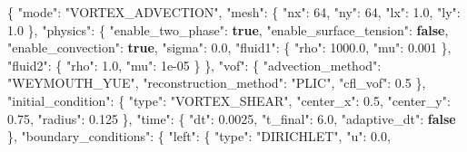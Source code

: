 \documentclass[
  10pt,
]{article}
\newenvironment{Shaded}{}{}
\newcommand{\DataTypeTok}[1]{\textcolor[rgb]{0.56,0.13,0.00}{#1}}
\newcommand{\DecValTok}[1]{\textcolor[rgb]{0.25,0.63,0.44}{#1}}
\newcommand{\FloatTok}[1]{\textcolor[rgb]{0.25,0.63,0.44}{#1}}
\newcommand{\FunctionTok}[1]{\textcolor[rgb]{0.02,0.16,0.49}{#1}}
\newcommand{\KeywordTok}[1]{\textcolor[rgb]{0.00,0.44,0.13}{\textbf{#1}}}
\newcommand{\StringTok}[1]{\textcolor[rgb]{0.25,0.44,0.63}{#1}}
\begin{document}
\begin{Shaded}
\begin{Highlighting}[]
\FunctionTok{\{}
  \DataTypeTok{"mode"}\FunctionTok{:} \StringTok{"VORTEX\_ADVECTION"}\FunctionTok{,}
  \DataTypeTok{"mesh"}\FunctionTok{:} \FunctionTok{\{}
    \DataTypeTok{"nx"}\FunctionTok{:} \DecValTok{64}\FunctionTok{,}
    \DataTypeTok{"ny"}\FunctionTok{:} \DecValTok{64}\FunctionTok{,}
    \DataTypeTok{"lx"}\FunctionTok{:} \FloatTok{1.0}\FunctionTok{,}
    \DataTypeTok{"ly"}\FunctionTok{:} \FloatTok{1.0}
  \FunctionTok{\},}
  \DataTypeTok{"physics"}\FunctionTok{:} \FunctionTok{\{}
    \DataTypeTok{"enable\_two\_phase"}\FunctionTok{:} \KeywordTok{true}\FunctionTok{,}
    \DataTypeTok{"enable\_surface\_tension"}\FunctionTok{:} \KeywordTok{false}\FunctionTok{,}
    \DataTypeTok{"enable\_convection"}\FunctionTok{:} \KeywordTok{true}\FunctionTok{,}
    \DataTypeTok{"sigma"}\FunctionTok{:} \FloatTok{0.0}\FunctionTok{,}
    \DataTypeTok{"fluid1"}\FunctionTok{:} \FunctionTok{\{}
      \DataTypeTok{"rho"}\FunctionTok{:} \FloatTok{1000.0}\FunctionTok{,}
      \DataTypeTok{"mu"}\FunctionTok{:} \FloatTok{0.001}
    \FunctionTok{\},}
    \DataTypeTok{"fluid2"}\FunctionTok{:} \FunctionTok{\{}
      \DataTypeTok{"rho"}\FunctionTok{:} \FloatTok{1.0}\FunctionTok{,}
      \DataTypeTok{"mu"}\FunctionTok{:} \DecValTok{1e{-}05}
    \FunctionTok{\}}
  \FunctionTok{\},}
  \DataTypeTok{"vof"}\FunctionTok{:} \FunctionTok{\{}
    \DataTypeTok{"advection\_method"}\FunctionTok{:} \StringTok{"WEYMOUTH\_YUE"}\FunctionTok{,}
    \DataTypeTok{"reconstruction\_method"}\FunctionTok{:} \StringTok{"PLIC"}\FunctionTok{,}
    \DataTypeTok{"cfl\_vof"}\FunctionTok{:} \FloatTok{0.5}
  \FunctionTok{\},}
  \DataTypeTok{"initial\_condition"}\FunctionTok{:} \FunctionTok{\{}
    \DataTypeTok{"type"}\FunctionTok{:} \StringTok{"VORTEX\_SHEAR"}\FunctionTok{,}
    \DataTypeTok{"center\_x"}\FunctionTok{:} \FloatTok{0.5}\FunctionTok{,}
    \DataTypeTok{"center\_y"}\FunctionTok{:} \FloatTok{0.75}\FunctionTok{,}
    \DataTypeTok{"radius"}\FunctionTok{:} \FloatTok{0.125}
  \FunctionTok{\},}
  \DataTypeTok{"time"}\FunctionTok{:} \FunctionTok{\{}
    \DataTypeTok{"dt"}\FunctionTok{:} \FloatTok{0.0025}\FunctionTok{,}
    \DataTypeTok{"t\_final"}\FunctionTok{:} \FloatTok{6.0}\FunctionTok{,}
    \DataTypeTok{"adaptive\_dt"}\FunctionTok{:} \KeywordTok{false}
  \FunctionTok{\},}
  \DataTypeTok{"boundary\_conditions"}\FunctionTok{:} \FunctionTok{\{}
    \DataTypeTok{"left"}\FunctionTok{:} \FunctionTok{\{}
      \DataTypeTok{"type"}\FunctionTok{:} \StringTok{"DIRICHLET"}\FunctionTok{,}
      \DataTypeTok{"u"}\FunctionTok{:} \FloatTok{0.0}\FunctionTok{,}

\end{Highlighting}
\end{Shaded}
\end{document}

